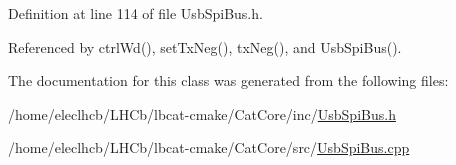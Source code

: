 Definition at line 114 of file Usb\+Spi\+Bus.\+h.



Referenced by ctrl\+Wd(), set\+Tx\+Neg(), tx\+Neg(), and Usb\+Spi\+Bus().



The documentation for this class was generated from the following files\+:\begin{DoxyCompactItemize}
\item 
/home/eleclhcb/\+L\+H\+Cb/lbcat-\/cmake/\+Cat\+Core/inc/\hyperlink{UsbSpiBus_8h}{Usb\+Spi\+Bus.\+h}\item 
/home/eleclhcb/\+L\+H\+Cb/lbcat-\/cmake/\+Cat\+Core/src/\hyperlink{UsbSpiBus_8cpp}{Usb\+Spi\+Bus.\+cpp}\end{DoxyCompactItemize}
